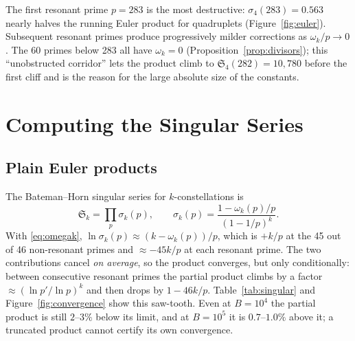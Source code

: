 ﻿\documentclass[11pt,a4paper]{article}
\newcommand{\Sk}[1]{\mathfrak{S}_{#1}}
\begin{document}
The first resonant prime $p = 283$ is the most destructive:
$\sigma_4(283) = 0.563$ nearly halves the running Euler product for quadruplets
(Figure~\ref{fig:euler}).  Subsequent resonant primes produce progressively milder
corrections as $\omega_k/p \to 0$.  The 60 primes below 283 all have
$\omega_k = 0$ (Proposition~\ref{prop:divisors}); this ``unobstructed corridor''
lets the product climb to $\Sk{4}(282) = 10{,}780$ before the first cliff and is
the reason for the large absolute size of the constants.

\section{Computing the Singular Series}\label{sec:singular}

\subsection{Plain Euler products}

The Bateman--Horn singular series for $k$-constellations is
\begin{equation}\label{eq:Sk}
  \Sk{k} = \prod_{p} \sigma_k(p), \qquad
  \sigma_k(p) = \frac{1 - \omega_k(p)/p}{(1 - 1/p)^k}.
\end{equation}
With \eqref{eq:omegak}, $\ln \sigma_k(p) \approx (k - \omega_k(p))/p$, which is
$+k/p$ at the 45 out of 46 non-resonant primes and $\approx -45k/p$ at each
resonant prime.  The two contributions cancel \emph{on average}, so the product
converges, but only conditionally: between consecutive resonant primes the
partial product climbs by a factor $\approx (\ln p'/\ln p)^k$ and then drops by
$1 - 46k/p$.  Table~\ref{tab:singular} and Figure~\ref{fig:convergence} show
this saw-tooth.  Even at $B = 10^4$ the partial product is still $2$--$3\%$
below its limit, and at $B = 10^5$ it is $0.7$--$1.0\%$ above it; a truncated
product cannot certify its own convergence.
\end{document}
